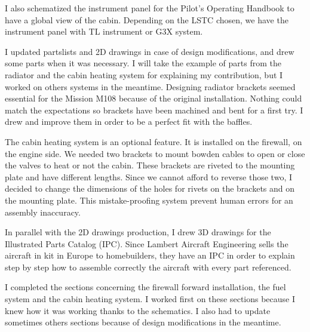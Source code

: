 \documentclass[11pt,a4paper]{report}
\begin{document}

\bigskip

I also schematized the instrument panel for the Pilot's Operating Handbook to have a global view of the cabin. Depending on the LSTC chosen, we have the instrument panel with TL instrument or G3X system.

\bigskip

I updated partslists and 2D drawings in case of design modifications, and drew some parts when it was necessary. I will take the example of parts from the radiator and the cabin heating system for explaining my contribution, but I worked on others systems in the meantime.
Designing radiator brackets seemed essential for the Mission M108 because of the original installation. Nothing could match the expectations so brackets have been machined and bent for a first try. I drew and improve them in order to be a perfect fit with the baffles.

\bigskip

The cabin heating system is an optional feature. It is installed on the firewall, on the engine side. We needed two brackets to mount bowden cables to open or close the valves to heat or not the cabin. These brackets are riveted to the mounting plate and have different lengths. Since we cannot afford to reverse those two, I decided to change the dimensions of the holes for rivets on the brackets and on the mounting plate. This mistake-proofing system prevent human errors for an assembly inaccuracy.

\bigskip

In parallel with the 2D drawings production, I drew 3D drawings for the Illustrated Parts Catalog (IPC). Since Lambert Aircraft Engineering sells the aircraft in kit in Europe to homebuilders, they have an IPC in order to explain step by step how to assemble correctly the aircraft with every part referenced.

\bigskip

I completed the sections concerning the firewall forward installation, the fuel system and the cabin heating system. I worked first on these sections because I knew how it was working thanks to the schematics. I also had to update sometimes others sections because of design modifications in the meantime.
\end{document}
